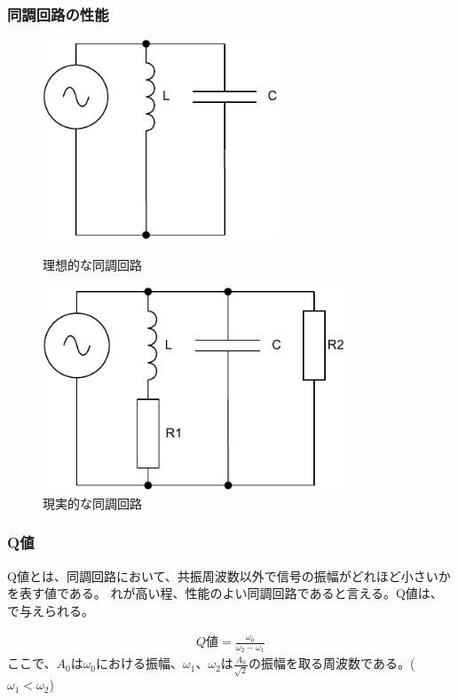 \documentclass[report.tex]{subfiles}
\begin{document}
\subsubsection{同調回路の性能}

\begin{figure}[H]
	\begin{minipage}[b]{0.4\linewidth}
		\centering
		\includegraphics[width=7cm]{fig/kyo.pdf}
		\caption{理想的な同調回路}
		\label{fig:kyo}
	\end{minipage}
	\begin{minipage}[b]{0.6\linewidth}
		\centering
		\includegraphics[width=9cm]{fig/kyo2.pdf}
		\caption{現実的な同調回路}
		\label{fig:kyo2}
	\end{minipage}
\end{figure}

\subsubsection{Q値}

Q値とは、同調回路において、共振周波数以外で信号の振幅がどれほど小さいかを表す値である。
れが高い程、性能のよい同調回路であると言える。Q値は、で与えられる\cite{ノート}。

\begin{align}
	Q値 =\frac{\omega_0}{\omega_2 - \omega_1}
\end{align}
ここで、$A_0$は$\omega_0$における振幅、$\omega_1、\omega_2$は$\frac{A_0}{\sqrt{2}}$の振幅を取る周波数である。($\omega_1<\omega_2$) \label{eq:Q}
\end{document}
